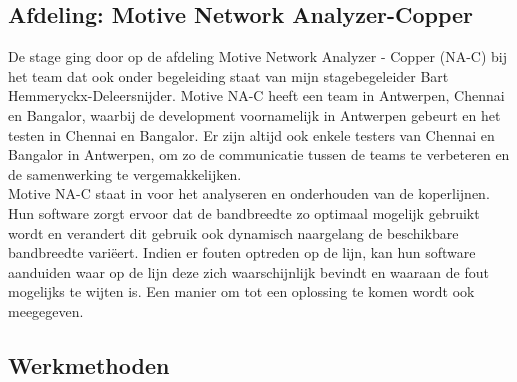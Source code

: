 \documentclass[10pt,a4paper]{article}
\begin{document}
\subsection{Afdeling: Motive Network Analyzer-Copper}
\label{afdeling}
De stage ging door op de afdeling Motive Network Analyzer - Copper (NA-C) bij het team dat ook onder begeleiding staat van mijn stagebegeleider Bart Hemmeryckx-Deleersnijder. Motive NA-C heeft een team in Antwerpen, Chennai en Bangalor, waarbij de development voornamelijk in Antwerpen gebeurt en het testen in Chennai en Bangalor. Er zijn altijd ook enkele testers van Chennai en Bangalor in Antwerpen, om zo de communicatie tussen de teams te verbeteren en de samenwerking te vergemakkelijken.\\
Motive NA-C staat in voor het analyseren en onderhouden van de koperlijnen. Hun software zorgt ervoor dat de bandbreedte zo optimaal mogelijk gebruikt wordt en verandert dit gebruik ook dynamisch naargelang de beschikbare bandbreedte vari\"eert. Indien er fouten optreden op de lijn, kan hun software aanduiden waar op de lijn deze zich waarschijnlijk bevindt en waaraan de fout mogelijks te wijten is. Een manier om tot een oplossing te komen wordt ook meegegeven.
\subsection{Werkmethoden}
\label{methoden}
\end{document}
